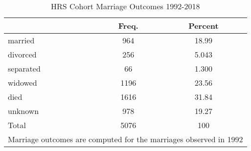 \begin{table}[htbp]\centering
\def\sym#1{\ifmmode^{#1}\else\(^{#1}\)\fi}
\caption{HRS Cohort Marriage Outcomes 1992-2018}
\begin{tabular}{l*{1}{cc}}
\hline\hline
            &       Freq.&     Percent\\
\hline
married     &         964&       18.99\\
divorced    &         256&       5.043\\
separated   &          66&       1.300\\
widowed     &        1196&       23.56\\
died        &        1616&       31.84\\
unknown     &         978&       19.27\\
Total       &        5076&         100\\
\hline\hline
\multicolumn{3}{l}{\footnotesize Marriage outcomes are computed for the marriages observed in 1992}\\
\end{tabular}
\end{table}
